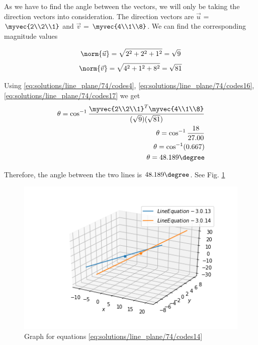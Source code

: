 \begin{enumerate}
As we have to find the angle between the vectors, we will only be taking the direction vectors into consideration. The direction vectors are $\vec{u}$ = $\myvec{2\\2\\1}$ and $\vec{v}$ = $\myvec{4\\1\\8}$. We can find the corresponding magnitude values

\begin{align}\label{eq:solutions/line_plane/74/codes16}
	\norm{\vec{u}} =\sqrt{2^{2}+2^{2}+1^{2}} =\sqrt{9}
\end{align}
\begin{align}\label{eq:solutions/line_plane/74/codes17}
	\norm{\vec{v}} =\sqrt{4^{2}+1^{2}+8^{2}} =\sqrt{81}
\end{align}

Using \ref{eq:solutions/line_plane/74/codes4}, \ref{eq:solutions/line_plane/74/codes16}, \ref{eq:solutions/line_plane/74/codes17} we get
\begin{align}
	\theta = \cos ^{-1}\frac{\myvec{2\\2\\1}^{T}\myvec{4\\1\\8}}{(\sqrt{9})(\sqrt{81})} 
	\\
	\theta = \cos ^{-1}\frac{18}{27.00}
	\\
	\theta = \cos ^{-1} (0.667)
	\\
	\theta = 48.189\degree
\end{align}

Therefore, the angle between the two lines is $48.189\degree$. See Fig. \ref{fig:solutions/line_plane/74/codesline_equation_2}


\begin{figure}
	\centering
	\includegraphics[width=\columnwidth]{./solutions/line_plane/74/codes/figs/Line_interest_2.png}
	\caption{Graph for equations \ref{eq:solutions/line_plane/74/codes14}}
	\label{fig:solutions/line_plane/74/codesline_equation_2}
\end{figure}
\end{enumerate}

    
